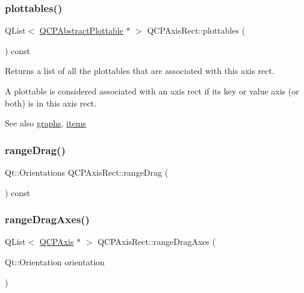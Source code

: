 \mbox{\label{class_q_c_p_axis_rect_a587d073a97b27bc7293fab4b2774ad59}} 
\subsubsection{\texorpdfstring{plottables()}{plottables()}}
{\footnotesize\ttfamily Q\+List$<$ \mbox{\hyperlink{class_q_c_p_abstract_plottable}{Q\+C\+P\+Abstract\+Plottable}} $\ast$ $>$ Q\+C\+P\+Axis\+Rect\+::plottables (\begin{DoxyParamCaption}{ }\end{DoxyParamCaption}) const}

Returns a list of all the plottables that are associated with this axis rect.

A plottable is considered associated with an axis rect if its key or value axis (or both) is in this axis rect.

\begin{DoxySeeAlso}{See also}
\mbox{\hyperlink{class_q_c_p_axis_rect_a2d9ded3eca97be1fcb5867949391bb88}{graphs}}, \mbox{\hyperlink{class_q_c_p_axis_rect_a03c113a2175448300ee8f944e24776ba}{items}} 
\end{DoxySeeAlso}
\mbox{\label{class_q_c_p_axis_rect_aa3a84c768ad6edd08fd4c5dec176828f}} 
\subsubsection{\texorpdfstring{rangeDrag()}{rangeDrag()}}
{\footnotesize\ttfamily Qt\+::\+Orientations Q\+C\+P\+Axis\+Rect\+::range\+Drag (\begin{DoxyParamCaption}{ }\end{DoxyParamCaption}) const\hspace{0.3cm}{\ttfamily [inline]}}

\mbox{\label{class_q_c_p_axis_rect_aae5f99a044ca911685a306f01b7ff941}} 
\subsubsection{\texorpdfstring{rangeDragAxes()}{rangeDragAxes()}}
{\footnotesize\ttfamily Q\+List$<$ \mbox{\hyperlink{class_q_c_p_axis}{Q\+C\+P\+Axis}} $\ast$ $>$ Q\+C\+P\+Axis\+Rect\+::range\+Drag\+Axes (\begin{DoxyParamCaption}\item[{Qt\+::\+Orientation}]{orientation }\end{DoxyParamCaption})}

